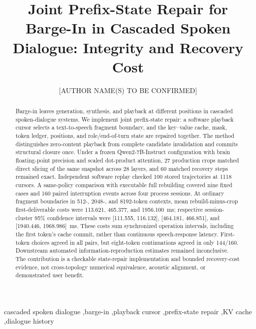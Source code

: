 \documentclass[preprint,12pt,authoryear]{elsarticle}
\begin{document}
\hypersetup{pageanchor=false}

\begin{frontmatter}

\title{Joint Prefix-State Repair for Barge-In in Cascaded Spoken Dialogue: Integrity and Recovery Cost}

\author[aff1]{[AUTHOR NAME(S) TO BE CONFIRMED]}

\begin{abstract}
Barge-in leaves generation, synthesis, and playback at different positions in cascaded spoken-dialogue systems. We implement joint prefix-state repair: a software playback cursor selects a text-to-speech fragment boundary, and the key--value cache, mask, token ledger, positions, and role/end-of-turn state are repaired together. The method distinguishes zero-content playback from complete candidate invalidation and commits structural closure once. Under a frozen Qwen2-7B-Instruct configuration with brain floating-point precision and scaled dot-product attention, 27 production crops matched direct slicing of the same snapshot across 28 layers, and 60 matched recovery steps remained exact. Independent software replay checked 100 stored trajectories at 1118 cursors. A same-policy comparison with executable full rebuilding covered nine fixed cases and 160 paired interruption events across four process sessions. At ordinary fragment boundaries in 512-, 2048-, and 8192-token contexts, mean rebuild-minus-crop first-deliverable costs were 113.621, 465.377, and 1956.100~ms; respective session-cluster 95\% confidence intervals were [111.555, 116.132], [464.181, 466.851], and [1940.446, 1968.986]~ms. These costs sum synchronized operation intervals, including the first token's cache commit, rather than continuous speech-response latency. First-token choices agreed in all pairs, but eight-token continuations agreed in only 144/160. Downstream automated information-reproduction estimates remained inconclusive. The contribution is a checkable state-repair implementation and bounded recovery-cost evidence, not cross-topology numerical equivalence, acoustic alignment, or demonstrated user benefit.
\end{abstract}


\begin{keyword}
cascaded spoken dialogue \sep barge-in \sep playback cursor \sep prefix-state repair \sep KV cache \sep dialogue history
\end{keyword}

\end{frontmatter}
\hypersetup{pageanchor=true}
\end{document}
